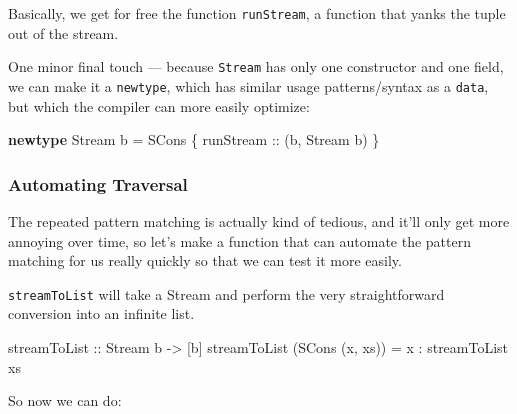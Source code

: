 \documentclass[]{article}
\newenvironment{Shaded}{}{}
\newcommand{\KeywordTok}[1]{\textcolor[rgb]{0.00,0.44,0.13}{\textbf{{#1}}}}
\newcommand{\DataTypeTok}[1]{\textcolor[rgb]{0.56,0.13,0.00}{{#1}}}
\newcommand{\DecValTok}[1]{\textcolor[rgb]{0.25,0.63,0.44}{{#1}}}
\newcommand{\OtherTok}[1]{\textcolor[rgb]{0.00,0.44,0.13}{{#1}}}
\newcommand{\FunctionTok}[1]{\textcolor[rgb]{0.02,0.16,0.49}{{#1}}}
\newcommand{\NormalTok}[1]{{#1}}
\begin{document}
Basically, we get for free the function \texttt{runStream}, a function that yanks the tuple out of
the stream.

One minor final touch --- because \texttt{Stream} has only one constructor and one field, we can
make it a \texttt{newtype}, which has similar usage patterns/syntax as a \texttt{data}, but which
the compiler can more easily optimize:

\begin{Shaded}
\begin{Highlighting}[]
\KeywordTok{newtype} \DataTypeTok{Stream} \NormalTok{b }\FunctionTok{=} \DataTypeTok{SCons} \NormalTok{\{}\OtherTok{ runStream ::} \NormalTok{(b, }\DataTypeTok{Stream} \NormalTok{b) \}}
\end{Highlighting}
\end{Shaded}

\subsubsection{Automating Traversal}\label{automating-traversal}

The repeated pattern matching is actually kind of tedious, and it'll only get more annoying over
time, so let's make a function that can automate the pattern matching for us really quickly so that
we can test it more easily.

\texttt{streamToList} will take a Stream and perform the very straightforward conversion into an
infinite list.

\begin{Shaded}
\begin{Highlighting}[]
\OtherTok{streamToList ::} \DataTypeTok{Stream} \NormalTok{b }\OtherTok{->} \NormalTok{[b]}
\NormalTok{streamToList (}\DataTypeTok{SCons} \NormalTok{(x, xs)) }\FunctionTok{=} \NormalTok{x }\FunctionTok{:} \NormalTok{streamToList xs}
\end{Highlighting}
\end{Shaded}

So now we can do:

\begin{Shaded}
\end{Shaded}
\end{document}
